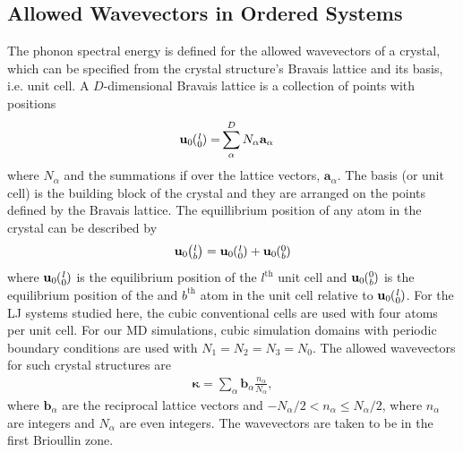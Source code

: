 \documentclass[letterpaper,12pt]{article}
\newcommand{\ab}[2]{\mspace{-4.0mu}\left(\mspace{-8.0mu}\begin{smallmatrix}&\ifthenelse{\equal{#1}{}}{a}{#1} \\&\ifthenelse{\equal{#2}{}}{b}{#2}\end{smallmatrix}\mspace{-3.0mu}\right)}
\begin{document}
\subsection{\label{A-Allowed-Wavevectors-Ordered}Allowed Wavevectors in Ordered Systems}
The phonon spectral energy is defined for the allowed wavevectors of a crystal, which can be specified from the crystal structure's Bravais lattice and its basis, i.e. unit cell. A $D$-dimensional Bravais lattice is a collection of points with
positions
\begin{equation}\label{crys_pos}
\begin{split}
\mathbf{u}_0\ab{l}{0} =& \sum^D_{\alpha} N_{\alpha}\mathbf{a}_{\alpha}
\end{split}
\end{equation}
where $N_{\alpha}$ and the summations if over the lattice vectors, $\mathbf{a}_{\alpha}$.\cite{ashcroft1976} The basis (or unit cell) is the building block of the crystal and they are arranged on the points defined by the Bravais lattice. The equillibrium position of any atom in the crystal can be described by
\begin{equation}\label{crys_pos2}
\begin{split}
\mathbf{u}_0\ab{l}{b} = \mathbf{u}_0\ab{l}{0} + \mathbf{u}_0\ab{0}{b}
\end{split}
\end{equation}
where $\mathbf{u}_0\ab{l}{0}$ is the equilibrium position of the $l^{\textrm{th}}$ unit cell and $\mathbf{u}_0\ab{0}{b}$ is the equilibrium position of the and $b^{\textrm{th}}$ atom in the unit cell relative to $\mathbf{u}_0\ab{l}{0}$.
For the LJ systems studied here, the cubic conventional cells are used with four atoms per unit cell.\cite{ashcroft1976} For our MD simulations, cubic simulation domains with periodic boundary conditions are used with $N_1 = N_2 = N_3 = N_0$.\cite{turney2009a,mcgaughey2004a} The allowed wavevectors for such crystal structures are
\begin{equation}\label{crys_pos3}
\begin{split}
\pmb{\kappa} = \sum_{\alpha} \mathbf{b}_{\alpha} \frac{n_{\alpha}}{N_{\alpha}},
\end{split}
\end{equation}
where $\mathbf{b}_{\alpha}$ are the reciprocal lattice vectors\cite{ashcroft1976} and $-N_{\alpha}/2 < n_{\alpha} \leq N_{\alpha}/2$, where $n_{\alpha}$ are integers and $N_{\alpha}$ are even integers.\cite{turney2009a} The wavevectors are taken to be in the first Brioullin zone.\cite{ashcroft1976}
\end{document}
